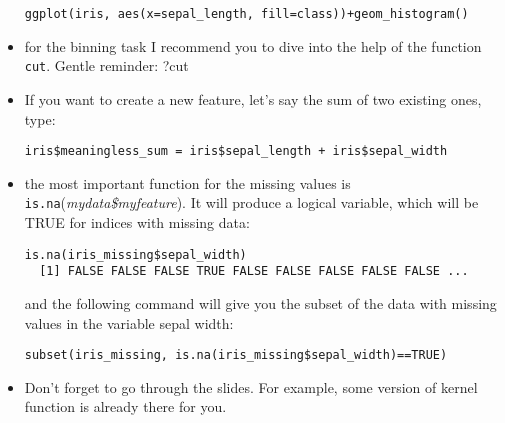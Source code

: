\documentclass{article}
\begin{document}
\begin{itemize}
\begin{lstlisting}
ggplot(iris, aes(x=sepal_length, fill=class))+geom_histogram()
\end{lstlisting}
\item for the binning task I recommend you to dive into the help of the function \texttt{cut}. Gentle reminder: ?cut 
\item If you want to create a new feature, let's say the sum of two existing ones, type: 
\begin{lstlisting}
iris$meaningless_sum = iris$sepal_length + iris$sepal_width
\end{lstlisting}
\item the most important function for the missing values is   \texttt{is.na}(\emph{mydata\$myfeature}). It will produce a logical variable, which will be TRUE for indices with missing data:
\begin{lstlisting}
is.na(iris_missing$sepal_width)
  [1] FALSE FALSE FALSE TRUE FALSE FALSE FALSE FALSE FALSE ...
\end{lstlisting}
and the following command will give you the subset of the data with missing values in the variable sepal width:
\begin{lstlisting}
subset(iris_missing, is.na(iris_missing$sepal_width)==TRUE)
\end{lstlisting}
\item Don't forget to go through the slides. For example, some version of kernel function is already there for you. 
\end{itemize}
\end{document}
